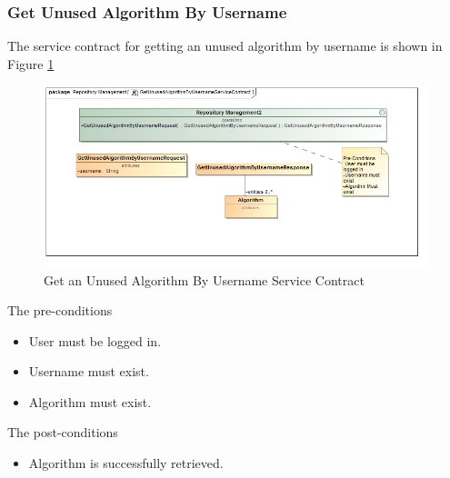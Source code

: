 \subsubsection{Get Unused Algorithm By Username}
The service contract for getting an unused algorithm by username is shown in Figure \ref{fig:getUnusedAlgorithmByUsername}
\begin{figure}[H]
	\begin{center}
		\includegraphics[scale=0.6]{../Diagrams and Charts/Test Data/GetUnusedAlgorithmByUsernameServiceContract.jpg}
		\caption{Get an Unused Algorithm By Username Service Contract}
		\label{fig:getUnusedAlgorithmByUsername}
	\end{center}
	
\end{figure}	

The pre-conditions
\begin{itemize}
	\item User must be logged in.
	\item Username must exist.
	\item Algorithm must exist.
\end{itemize}

The post-conditions
\begin{itemize}
	\item Algorithm is successfully retrieved.
\end{itemize}

